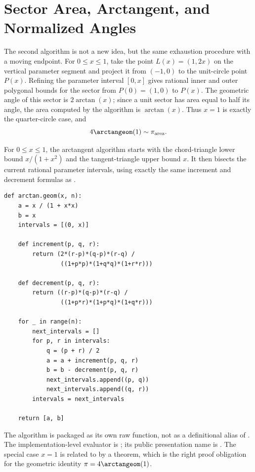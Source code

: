 \section{Sector Area, Arctangent, and Normalized Angles}

The second algorithm is not a new idea, but the same exhaustion procedure with
a moving endpoint.  For \(0\le x\le1\), take the point \(L(x)=(1,2x)\) on the
vertical parameter segment and project it from \((-1,0)\) to the unit-circle
point \(P(x)\).  Refining the parameter interval \([0,x]\) gives rational
inner and outer polygonal bounds for the sector from \(P(0)=(1,0)\) to
\(P(x)\).  The geometric angle of this sector is \(2\arctan(x)\); since a unit
sector has area equal to half its angle, the area computed by the algorithm is
\(\arctan(x)\).  Thus \(x=1\) is exactly the quarter-circle case, and
\[
  4\arctangeom(1)\sim \pi_{\mathrm{area}}.
\]

\begin{definition}
\label{def:geometric-arctan}
\label{def:arctan-area-stage-algorithm}
For \(0\le x\le1\), the arctangent algorithm starts with the chord-triangle
lower bound \(x/(1+x^2)\) and the tangent-triangle upper bound \(x\).  It then
bisects the current rational parameter intervals, using exactly the same
increment and decrement formulas as .
\begin{verbatim}
def arctan.geom(x, n):
    a = x / (1 + x*x)
    b = x
    intervals = [(0, x)]

    def increment(p, q, r):
        return (2*(r-p)*(q-p)*(r-q) /
                ((1+p*p)*(1+q*q)*(1+r*r)))

    def decrement(p, q, r):
        return ((r-p)*(q-p)*(r-q) /
                ((1+p*r)*(1+p*q)*(1+q*r)))

    for _ in range(n):
        next_intervals = []
        for p, r in intervals:
            q = (p + r) / 2
            a = a + increment(p, q, r)
            b = b - decrement(p, q, r)
            next_intervals.append((p, q))
            next_intervals.append((q, r))
        intervals = next_intervals

    return [a, b]
\end{verbatim}
The algorithm is packaged as its own raw function, not as a definitional
alias of .  The implementation-level evaluator is
; its public presentation name is
.  The special case \(x=1\) is related to
 by a theorem, which is the right proof obligation for the
geometric identity \(\pi=4\arctangeom(1)\).
\end{definition}

